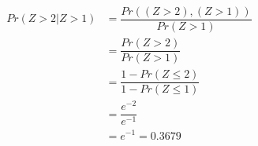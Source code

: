

 \begin{align}
 Pr{(Z>2 | Z>1)} &= \dfrac{Pr{((Z>2),(Z>1))}}{Pr{(Z>1)}} \\
                 &= \dfrac{Pr{(Z>2)}}{Pr{(Z>1)}} \\
                 &= \dfrac{1 - Pr{(Z \le 2)}}{1 - Pr{(Z \le 1)}} \\
                 &= \dfrac{e^{-2}}{e^{-1}} \\
                 &= e^{-1} = 0.3679
\end{align}
